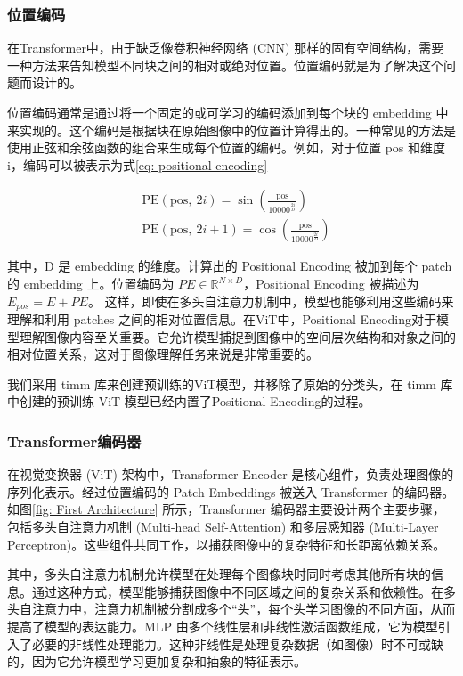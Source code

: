 \documentclass[a4paper]{ctexart}
\begin{document}
\subsubsection{位置编码}
	
在Transformer中，由于缺乏像卷积神经网络 (CNN) 那样的固有空间结构，需要一种方法来告知模型不同块之间的相对或绝对位置。位置编码就是为了解决这个问题而设计的。
	
位置编码通常是通过将一个固定的或可学习的编码添加到每个块的 embedding 中来实现的。这个编码是根据块在原始图像中的位置计算得出的。一种常见的方法是使用正弦和余弦函数的组合来生成每个位置的编码。例如，对于位置 pos 和维度 i，编码可以被表示为式\ref{eq: positional encoding}
	
\begin{equation}
	\begin{aligned}
		&\text{PE}(\text{pos}, \ 2i) = \sin \left(\frac{\text{pos}}{10000^{\frac{2i}{D}}}\right) \\
		&\text{PE}(\text{pos}, \ 2i + 1) = \cos \left(\frac{\text{pos}}{10000^{\frac{2i}{D}}}\right)
	\end{aligned}
	\label{eq: positional encoding}
\end{equation}
	
其中，D 是 embedding 的维度。计算出的 Positional Encoding 被加到每个 patch 的 embedding 上。位置编码为 $PE \in \mathbb{R}^{N \times D}$，Positional Encoding 被描述为 $E_{pos} = E + PE$。 这样，即使在多头自注意力机制中，模型也能够利用这些编码来理解和利用 patches 之间的相对位置信息。在ViT中，Positional Encoding对于模型理解图像内容至关重要。它允许模型捕捉到图像中的空间层次结构和对象之间的相对位置关系，这对于图像理解任务来说是非常重要的。
	
我们采用 timm 库来创建预训练的ViT模型，并移除了原始的分类头，在 timm 库中创建的预训练 ViT 模型已经内置了Positional Encoding的过程。
	
\subsubsection{Transformer编码器}
	
在视觉变换器 (ViT) 架构中，Transformer Encoder 是核心组件，负责处理图像的序列化表示。经过位置编码的 Patch Embeddings 被送入 Transformer 的编码器。如图\ref{fig: First Architecture} 所示，Transformer 编码器主要设计两个主要步骤，包括多头自注意力机制 (Multi-head Self-Attention) 和多层感知器 (Multi-Layer Perceptron)。这些组件共同工作，以捕获图像中的复杂特征和长距离依赖关系。
	
其中，多头自注意力机制允许模型在处理每个图像块时同时考虑其他所有块的信息。通过这种方式，模型能够捕获图像中不同区域之间的复杂关系和依赖性。在多头自注意力中，注意力机制被分割成多个“头”，每个头学习图像的不同方面，从而提高了模型的表达能力。MLP 由多个线性层和非线性激活函数组成，它为模型引入了必要的非线性处理能力。这种非线性是处理复杂数据（如图像）时不可或缺的，因为它允许模型学习更加复杂和抽象的特征表示。
	
\end{document}
